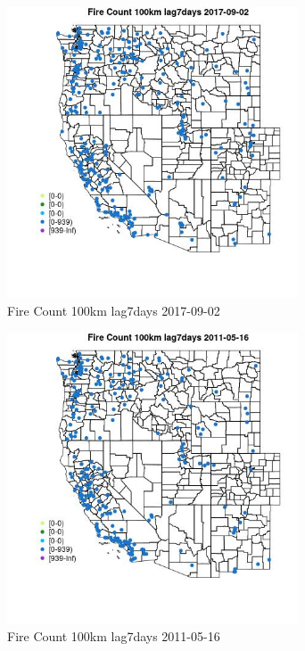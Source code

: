 \begin{figure} 
\centering  
\includegraphics[width=0.77\textwidth]{Code_Outputs/Report_ML_input_PM25_Step4_part_e_de_duplicated_aves_compiled_2019-05-20wNAs_MapObsFire_Count_100km_lag7days2017-09-02.jpg} 
\caption{\label{fig:Report_ML_input_PM25_Step4_part_e_de_duplicated_aves_compiled_2019-05-20wNAsMapObsFire_Count_100km_lag7days2017-09-02}Fire Count 100km lag7days 2017-09-02} 
\end{figure} 
 

\clearpage 

\begin{figure} 
\centering  
\includegraphics[width=0.77\textwidth]{Code_Outputs/Report_ML_input_PM25_Step4_part_e_de_duplicated_aves_compiled_2019-05-20wNAs_MapObsFire_Count_100km_lag7days2011-05-16.jpg} 
\caption{\label{fig:Report_ML_input_PM25_Step4_part_e_de_duplicated_aves_compiled_2019-05-20wNAsMapObsFire_Count_100km_lag7days2011-05-16}Fire Count 100km lag7days 2011-05-16} 
\end{figure} 
 


